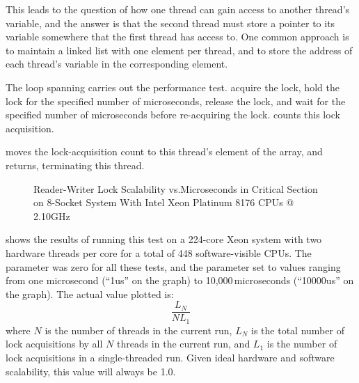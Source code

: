 {{	This leads to the question of how one thread can gain access to
	another thread's  variable, and the answer is that
	the second thread must store a pointer to its 
	variable somewhere that the first thread has access to.
	One common approach is to maintain a linked list with one
	element per thread, and to store the address of each thread's
	 variable in the corresponding element.
}\QuickQuizEndE
}

\begin{fcvref}
The loop spanning  carries out the performance test.
 acquire the lock,
 hold the lock for the specified
number of microseconds,
 release the lock,
and  wait for the specified
number of microseconds before re-acquiring the lock.
 counts this lock acquisition.

 moves the lock-acquisition count to this thread's element of the
 array, and  returns, terminating this thread.
\end{fcvref}

\begin{figure}
\centering
{}
\caption{Reader-Writer Lock Scalability vs.\@ Microseconds in Critical Section on 8-Socket System With Intel Xeon Platinum 8176 CPUs @ 2.10GHz}
\label{fig:toolsoftrade:Reader-Writer Lock Scalability vs. Microseconds in Critical Section}
\end{figure}

shows the results of running this test on a 224-core Xeon system
with two hardware threads per core for a total of 448 software-visible
CPUs.
The  parameter was zero for all these tests, and the
 parameter set to values ranging from one microsecond (``1us''
on the graph) to 10,000\,microseconds (``10000us'' on the graph).
The actual value plotted is:
\begin{equation}
	\frac{L_N}{N L_1}
\end{equation}
where $N$ is the number of threads in the current run,
$L_N$ is the total number of lock acquisitions by all $N$ threads in the
current run, and
$L_1$ is the number of lock acquisitions in a single-threaded run.
Given ideal hardware and software scalability, this value will always
be 1.0.

